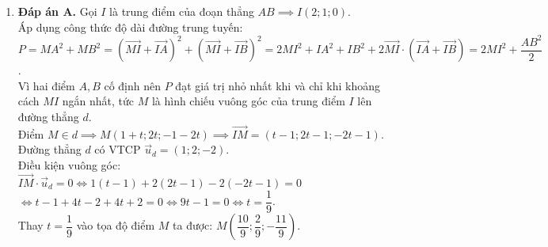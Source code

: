 \documentclass[12pt,a4paper]{article}
\begin{document}
\begin{enumerate}[label=\textbf{Câu \arabic*:}, leftmargin=*]
\item \textbf{Đáp án A.} Gọi $I$ là trung điểm của đoạn thẳng $AB \implies I(2; 1; 0)$.\\
Áp dụng công thức độ dài đường trung tuyến:\\
$P = MA^2 + MB^2 = (\overrightarrow{MI} + \overrightarrow{IA})^2 + (\overrightarrow{MI} + \overrightarrow{IB})^2 = 2MI^2 + IA^2 + IB^2 + 2\overrightarrow{MI} \cdot (\overrightarrow{IA} + \overrightarrow{IB}) = 2MI^2 + \dfrac{AB^2}{2}$.\\
Vì hai điểm $A, B$ cố định nên $P$ đạt giá trị nhỏ nhất khi và chỉ khi khoảng cách $MI$ ngắn nhất, tức $M$ là hình chiếu vuông góc của trung điểm $I$ lên đường thẳng $d$.\\
Điểm $M \in d \implies M(1 + t; 2t; -1 - 2t) \implies \overrightarrow{IM} = (t - 1; 2t - 1; -2t - 1)$.\\
Đường thẳng $d$ có VTCP $\vec{u}_d = (1; 2; -2)$.\\
Điều kiện vuông góc: $\overrightarrow{IM} \cdot \vec{u}_d = 0 \iff 1(t - 1) + 2(2t - 1) - 2(-2t - 1) = 0$\\
$\iff t - 1 + 4t - 2 + 4t + 2 = 0 \iff 9t - 1 = 0 \iff t = \dfrac{1}{9}$.\\
Thay $t = \dfrac{1}{9}$ vào tọa độ điểm $M$ ta được: $M\left(\dfrac{10}{9}; \dfrac{2}{9}; -\dfrac{11}{9}\right)$.
\end{enumerate}
\end{document}
